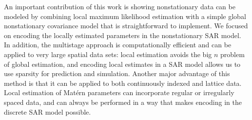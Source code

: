 \documentclass[review]{elsarticle}
\begin{document}
An important contribution of this work is showing nonstationary data can be modeled by combining local maximum likelihood estimation with a simple global nonstationary covariance model that is straightforward to implement. We focused on encoding the locally estimated parameters in the nonstationary SAR model. In addition, the multistage approach is computationally efficient and can be applied to very large spatial data sets: local estimation avoids the big $n$ problem of global estimation, and encoding local estimates in a SAR model allows us to use sparsity for prediction and simulation. Another major advantage of this method is that it can be applied to both continuously indexed and lattice data. Local estimation of Mat\'ern parameters can incorporate regular or irregularly spaced data, and can always be performed in a way that makes encoding in the discrete SAR model possible.








\end{document}
